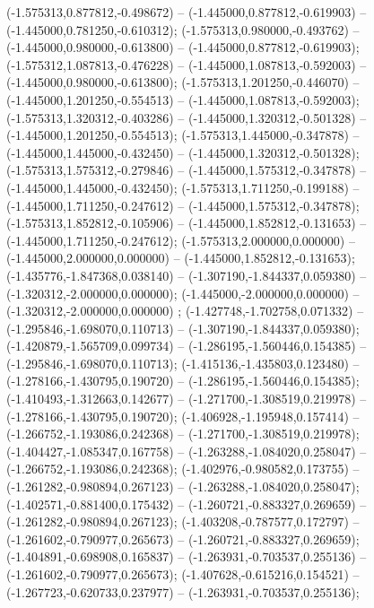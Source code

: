  (-1.575313,0.877812,-0.498672) -- (-1.445000,0.877812,-0.619903) -- (-1.445000,0.781250,-0.610312);
 (-1.575313,0.980000,-0.493762) -- (-1.445000,0.980000,-0.613800) -- (-1.445000,0.877812,-0.619903);
 (-1.575312,1.087813,-0.476228) -- (-1.445000,1.087813,-0.592003) -- (-1.445000,0.980000,-0.613800);
 (-1.575313,1.201250,-0.446070) -- (-1.445000,1.201250,-0.554513) -- (-1.445000,1.087813,-0.592003);
 (-1.575313,1.320312,-0.403286) -- (-1.445000,1.320312,-0.501328) -- (-1.445000,1.201250,-0.554513);
 (-1.575313,1.445000,-0.347878) -- (-1.445000,1.445000,-0.432450) -- (-1.445000,1.320312,-0.501328);
 (-1.575313,1.575312,-0.279846) -- (-1.445000,1.575312,-0.347878) -- (-1.445000,1.445000,-0.432450);
 (-1.575313,1.711250,-0.199188) -- (-1.445000,1.711250,-0.247612) -- (-1.445000,1.575312,-0.347878);
 (-1.575313,1.852812,-0.105906) -- (-1.445000,1.852812,-0.131653) -- (-1.445000,1.711250,-0.247612);
 (-1.575313,2.000000,0.000000) -- (-1.445000,2.000000,0.000000) -- (-1.445000,1.852812,-0.131653);
 (-1.435776,-1.847368,0.038140) -- (-1.307190,-1.844337,0.059380) -- (-1.320312,-2.000000,0.000000);
 (-1.445000,-2.000000,0.000000) -- (-1.320312,-2.000000,0.000000) ;
 (-1.427748,-1.702758,0.071332) -- (-1.295846,-1.698070,0.110713) -- (-1.307190,-1.844337,0.059380);
 (-1.420879,-1.565709,0.099734) -- (-1.286195,-1.560446,0.154385) -- (-1.295846,-1.698070,0.110713);
 (-1.415136,-1.435803,0.123480) -- (-1.278166,-1.430795,0.190720) -- (-1.286195,-1.560446,0.154385);
 (-1.410493,-1.312663,0.142677) -- (-1.271700,-1.308519,0.219978) -- (-1.278166,-1.430795,0.190720);
 (-1.406928,-1.195948,0.157414) -- (-1.266752,-1.193086,0.242368) -- (-1.271700,-1.308519,0.219978);
 (-1.404427,-1.085347,0.167758) -- (-1.263288,-1.084020,0.258047) -- (-1.266752,-1.193086,0.242368);
 (-1.402976,-0.980582,0.173755) -- (-1.261282,-0.980894,0.267123) -- (-1.263288,-1.084020,0.258047);
 (-1.402571,-0.881400,0.175432) -- (-1.260721,-0.883327,0.269659) -- (-1.261282,-0.980894,0.267123);
 (-1.403208,-0.787577,0.172797) -- (-1.261602,-0.790977,0.265673) -- (-1.260721,-0.883327,0.269659);
 (-1.404891,-0.698908,0.165837) -- (-1.263931,-0.703537,0.255136) -- (-1.261602,-0.790977,0.265673);
 (-1.407628,-0.615216,0.154521) -- (-1.267723,-0.620733,0.237977) -- (-1.263931,-0.703537,0.255136);
